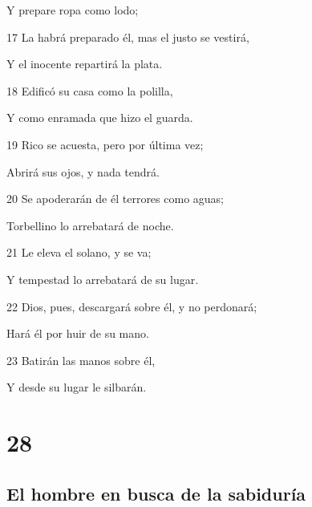 \par Y prepare ropa como lodo;
\par 17 La habrá preparado él, mas el justo se vestirá,
\par Y el inocente repartirá la plata.
\par 18 Edificó su casa como la polilla,
\par Y como enramada que hizo el guarda.
\par 19 Rico se acuesta, pero por última vez;
\par Abrirá sus ojos, y nada tendrá.
\par 20 Se apoderarán de él terrores como aguas;
\par Torbellino lo arrebatará de noche.
\par 21 Le eleva el solano, y se va;
\par Y tempestad lo arrebatará de su lugar.
\par 22 Dios, pues, descargará sobre él, y no perdonará;
\par Hará él por huir de su mano.
\par 23 Batirán las manos sobre él,
\par Y desde su lugar le silbarán.

\chapter{28}

\section*{El hombre en busca de la sabiduría}

